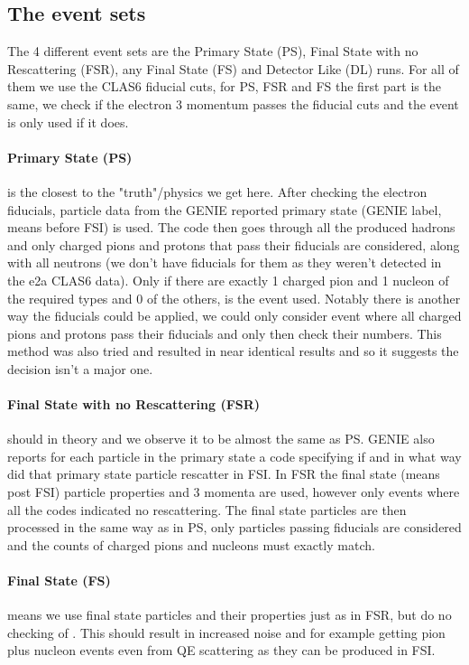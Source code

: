 \documentclass[a4paper,12pt]{article}
\newcommand{\verbb}[1]{\text{\Verb|#1|}}
\begin{document}
\subsection{The event sets}
The 4 different event sets are the Primary State (PS), Final State with no Rescattering (FSR), any Final State (FS) and Detector Like (DL) runs.
For all of them we use the CLAS6 fiducial cuts, for PS, FSR and FS the first part is the same, we check if the electron 3 momentum passes the fiducial cuts and the event is only used if it does.

\paragraph{Primary State (PS)} is the closest to the "truth"/physics we get here.
After checking the electron fiducials, particle data from the GENIE reported primary state (GENIE label, means before FSI) is used.
The code then goes through all the produced hadrons and only charged pions and protons that pass their fiducials are considered, along with all neutrons (we don't have fiducials for them as they weren't detected in the e2a CLAS6 data).
Only if there are exactly 1 charged pion and 1 nucleon of the required types and 0 of the others, is the event used.
Notably there is another way the fiducials could be applied, we could only consider event where all charged pions and protons pass their fiducials and only then check their numbers.
This method was also tried and resulted in near identical results and so it suggests the decision isn't a major one.

\paragraph{Final State with no Rescattering (FSR)} should in theory and we observe it to be almost the same as PS.
GENIE also reports for each particle in the primary state a \verbb{resc} code specifying if and in what way did that primary state particle rescatter in FSI.
In FSR the final state (means post FSI) particle properties and 3 momenta are used, however only events where all the \verbb{resc} codes indicated no rescattering.
The final state particles are then processed in the same way as in PS, only particles passing fiducials are considered and the counts of charged pions and nucleons must exactly match.

\paragraph{Final State (FS)} means we use final state particles and their properties just as in FSR, but do no checking of \verbb{resc}.
This should result in increased noise and for example getting pion plus nucleon events even from QE scattering as they can be produced in FSI.
\end{document}
